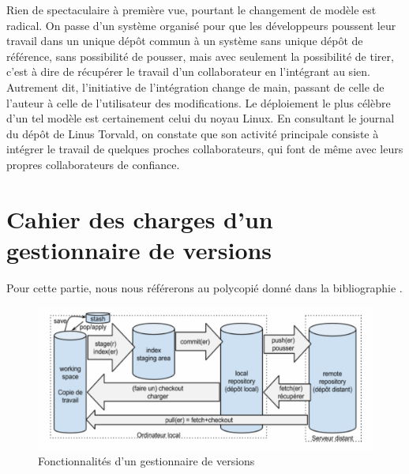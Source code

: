 Rien de spectaculaire à première vue, pourtant le changement de modèle est radical. On passe d'un système organisé pour que les développeurs poussent leur travail dans un unique dépôt commun à un système sans unique dépôt de référence, sans possibilité de pousser, mais avec seulement la possibilité de tirer, c'est à dire de récupérer le travail d'un collaborateur en l'intégrant au sien. Autrement dit, l'initiative de l'intégration change de main, passant de celle de l'auteur à celle de l'utilisateur des modifications. Le déploiement le plus célèbre d'un tel modèle est certainement celui du noyau Linux. En consultant le journal du dépôt de Linus Torvald, on constate que son activité principale consiste à intégrer le travail de quelques proches collaborateurs, qui font de même avec leurs propres collaborateurs de confiance.

\section{Cahier des charges d'un gestionnaire de versions}






Pour cette partie, nous nous référerons au polycopié donné dans la bibliographie \cite{Git-poly}. 

\begin{figure}[!h]
\centering
\includegraphics[scale=0.6]{images/technique_git.png}
\caption{Fonctionnalités d'un gestionnaire de versions}
\label{fonction}
\end{figure}


